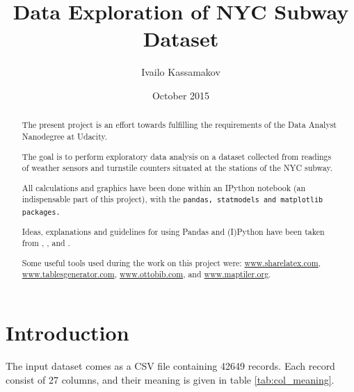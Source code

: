 \documentclass{article}
\title{Data Exploration of NYC Subway Dataset}
\author{Ivailo Kassamakov}
\date{October 2015}
\begin{document}
\maketitle
\begin{abstract}
The present project is an effort towards fulfilling the requirements of the Data Analyst Nanodegree at Udacity.

The goal is to perform exploratory data analysis on a dataset collected from readings of weather sensors and turnstile counters situated at the stations of the NYC subway.

All calculations and graphics have been done within an IPython notebook (an indispensable part of this project), with the \tt pandas\rm, \tt statmodels \rm and \tt matplotlib \rm packages.

Ideas, explanations and guidelines for using Pandas and (I)Python have been taken from \cite{anthony2015mastering}, \cite{mckinney2013python}, and \cite{rossant2013learning}.

Some useful tools used during the work on this project were: \href{www.sharelatex.com}{www.sharelatex.com}, \href{www.tablesgenerator.com}{www.tablesgenerator.com}, \href{www.ottobib.com}{www.ottobib.com}, and \href{www.maptiler.org}{www.maptiler.org}.
\end{abstract}

\tableofcontents

\listoffigures
 
\listoftables

\section{Introduction}

The input dataset comes as a CSV file containing 42649 records. Each record consist of 27 columns, and their meaning is given in table \ref{tab:col_meaning}.
\end{document}
